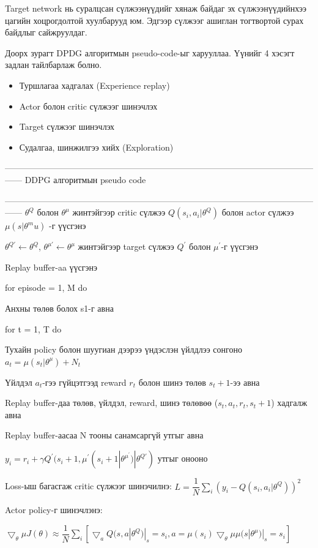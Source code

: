 \documentclass[12pt,A4]{report}
\begin{document}
Target network нь суралцсан сүлжээнүүдийг хянаж байдаг эх сүлжээнүүдийнхээ цагийн хоцрогдолтой хуулбарууд юм. Эдгээр сүлжээг ашиглан тогтвортой сурах байдлыг сайжруулдаг.	

Доорх зурагт DPDG алгоритмын pseudo-code-ыг харууллаа. Үүнийг 4 хэсэгт задлан тайлбарлаж болно.

\begin{itemize}
	\item Туршлагаа хадгалах (Experience replay)
	\item Actor болон critic сүлжээг шинэчлэх
	\item Target сүлжээг шинэчлэх
	\item Судалгаа, шинжилгээ хийх (Exploration)
\end{itemize} 

------------------------------------------------------------------------------------------------------------------
DDPG алгоритмын pseudo code

------------------------------------------------------------------------------------------------------------------
$\theta^Q$ болон $\theta^{\mu}$ жинтэйгээр critic сүлжээ $Q(s_i,a_i|\theta^Q)$ болон actor сүлжээ $\mu(s|\theta^mu)$ -г үүсгэнэ

$\theta^{Q{'}} \longleftarrow \theta^Q$, $\theta^{\mu{'}} \longleftarrow \theta^\mu$ жинтэйгээр target сүлжээ $Q^{'}$ болон $\mu^{'}$-г үүсгэнэ

Replay buffer-aa үүсгэнэ

for episode = 1, M do

\quad Анхны төлөв болох s1-г авна

\quad for t = 1, T do

\quad\quad Тухайн policy болон шуугиан дээрээ үндэслэн үйлдлээ сонгоно $a_t = \mu(s_t|\theta^\mu)+N_t$

\quad\quad Үйлдэл $a_t$-гээ гүйцэтгээд reward $r_t$ болон шинэ төлөв $s_t+1$-ээ авна

\quad\quad Replay buffer-даа төлөв, үйлдэл, reward, шинэ төлөвөө ($s_t, a_t, r_t, s_t+1$) хадгалж авна

\quad\quad Replay buffer-аасаа N тооны санамсаргүй утгыг авна

\quad\quad $y_i=r_i+\gamma{Q^{'}}(s_i+1,\mu^{'}(s_i+1|\theta^{\mu^{'}})|\theta^{Q{'}})$ утгыг онооно

\quad\quad Loss-ыш багасгаж critic сүлжээг шинэчилнэ: $L = \dfrac{1}{N}\sum_{i}(y_i-Q(s_i,a_i|\theta^Q))^2$

\quad\quad Actor policy-г шинэчлэнэ: 
\begin{center}
$\bigtriangledown_\theta\mu J(\theta) \approx \dfrac{1}{N}\sum_{i}[\bigtriangledown_a Q(s, a|\theta^Q)|_s=s_i,a=\mu(s_i)\bigtriangledown_\theta\mu \mu(s|\theta^\mu)|_s=s_i]$
\end{center}
\end{document}

